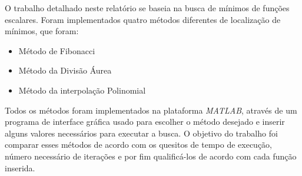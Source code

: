 O trabalho detalhado neste relatório se baseia na busca de mínimos de funções escalares. Foram implementados quatro métodos diferentes de localização de mínimos, que foram:

\begin{itemize}
	\item Método de Fibonacci
	\item Método da Divisão Áurea
	\item Método da interpolação Polinomial
\end{itemize}

Todos os métodos foram implementados na plataforma \textit{MATLAB}, através de um programa de interface gráfica usado para escolher o método desejado e inserir alguns valores necessários para executar a busca. O objetivo do trabalho foi comparar esses métodos de acordo com os quesitos de tempo de execução, número necessário de iterações e por fim qualificá-los de acordo com cada função inserida.